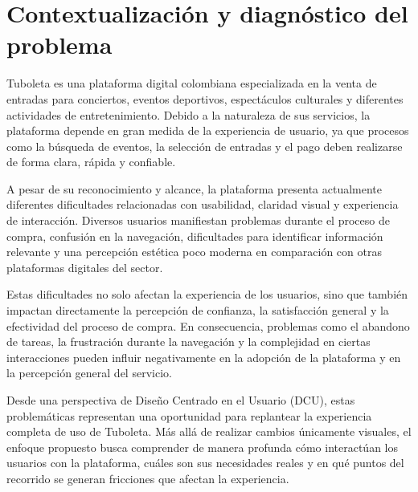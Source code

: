 \documentclass[12pt,letterpaper]{article}
\begin{document}
\begin{titlepage}
\vspace{0.45cm}

\end{titlepage}


\section{Contextualización y diagnóstico del problema}

Tuboleta es una plataforma digital colombiana especializada en la venta de entradas para conciertos, eventos deportivos, espectáculos culturales y diferentes actividades de entretenimiento. Debido a la naturaleza de sus servicios, la plataforma depende en gran medida de la experiencia de usuario, ya que procesos como la búsqueda de eventos, la selección de entradas y el pago deben realizarse de forma clara, rápida y confiable.

A pesar de su reconocimiento y alcance, la plataforma presenta actualmente diferentes dificultades relacionadas con usabilidad, claridad visual y experiencia de interacción. Diversos usuarios manifiestan problemas durante el proceso de compra, confusión en la navegación, dificultades para identificar información relevante y una percepción estética poco moderna en comparación con otras plataformas digitales del sector.

Estas dificultades no solo afectan la experiencia de los usuarios, sino que también impactan directamente la percepción de confianza, la satisfacción general y la efectividad del proceso de compra. En consecuencia, problemas como el abandono de tareas, la frustración durante la navegación y la complejidad en ciertas interacciones pueden influir negativamente en la adopción de la plataforma y en la percepción general del servicio.

Desde una perspectiva de Diseño Centrado en el Usuario (DCU), estas problemáticas representan una oportunidad para replantear la experiencia completa de uso de Tuboleta. Más allá de realizar cambios únicamente visuales, el enfoque propuesto busca comprender de manera profunda cómo interactúan los usuarios con la plataforma, cuáles son sus necesidades reales y en qué puntos del recorrido se generan fricciones que afectan la experiencia.
\end{document}
